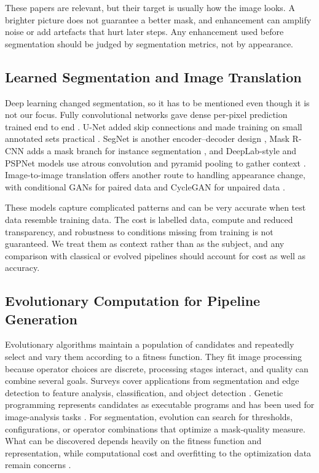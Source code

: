 \documentclass[11pt,a4paper]{article}
\begin{document}
These papers are relevant, but their target is usually how the image looks. A brighter picture does not guarantee a better mask, and enhancement can amplify noise or add artefacts that hurt later steps. Any enhancement used before segmentation should be judged by segmentation metrics, not by appearance.

\subsection{Learned Segmentation and Image Translation}

Deep learning changed segmentation, so it has to be mentioned even though it is not our focus. Fully convolutional networks gave dense per-pixel prediction trained end to end \cite{long2015}. U-Net added skip connections and made training on small annotated sets practical \cite{ronneberger2015}. SegNet is another encoder--decoder design \cite{badrinarayanan2017}, Mask R-CNN adds a mask branch for instance segmentation \cite{he2017}, and DeepLab-style and PSPNet models use atrous convolution and pyramid pooling to gather context \cite{chen2018deeplab,pspnet2017}. Image-to-image translation offers another route to handling appearance change, with conditional GANs for paired data \cite{isola2017} and CycleGAN for unpaired data \cite{zhu2017}.

These models capture complicated patterns and can be very accurate when test data resemble training data. The cost is labelled data, compute and reduced transparency, and robustness to conditions missing from training is not guaranteed. We treat them as context rather than as the subject, and any comparison with classical or evolved pipelines should account for cost as well as accuracy.

\subsection{Evolutionary Computation for Pipeline Generation}

Evolutionary algorithms maintain a population of candidates and repeatedly select and vary them according to a fitness function. They fit image processing because operator choices are discrete, processing stages interact, and quality can combine several goals. Surveys cover applications from segmentation and edge detection to feature analysis, classification, and object detection \cite{bi2023evolutionary}. Genetic programming represents candidates as executable programs and has been used for image-analysis tasks \cite{khan2021gp}. For segmentation, evolution can search for thresholds, configurations, or operator combinations that optimize a mask-quality measure. What can be discovered depends heavily on the fitness function and representation, while computational cost and overfitting to the optimization data remain concerns \cite{bi2023evolutionary,khan2021gp}.
\end{document}
